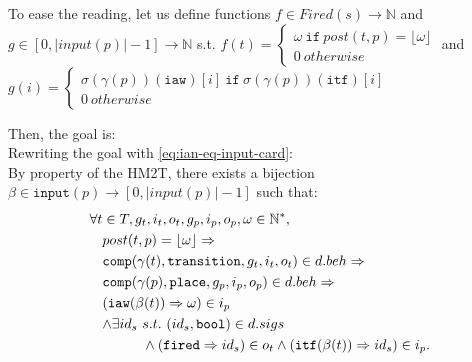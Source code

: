 \begin{itemize}
  To ease the reading, let us define functions
  $f\in{}Fired(s)\rightarrow\mathbb{N}$ and
  $g\in[0,\vert{}input(p)\vert-1]\rightarrow\mathbb{N}$ s.t. $f(t)=
  \begin{cases}
    \omega~\mathtt{if}~post(t,p)=\lfloor\omega\rfloor \\
    0~otherwise
  \end{cases}$
  and $g(i)=
  \begin{cases}
    \sigma(\gamma(p))(\texttt{iaw})[i]~\mathtt{if}~\sigma(\gamma(p))(\texttt{itf})[i]\\
    0~otherwise 
  \end{cases}$

  \noindent{}Then, the goal is: \\
                               
  \noindent{}Rewriting the goal with \eqref{eq:ian-eq-input-card}:
  \\

  By property of the HM2T, there exists a bijection
  $\beta\in\mathtt{input}(p)\rightarrow{}[0,\vert{}input(p)\vert-1]$
  such that:
  \begin{equation}
    \label{eq:bij-input}
    \begin{aligned}[t]
      \forall{}t&\in{}T,g_t,i_t,o_t,g_p,i_p,o_p,\omega\in\mathbb{N}^{*}, \\
                & post(t,p)=\lfloor\omega\rfloor\Rightarrow \\
                & \mathtt{comp}(\gamma(t),\mathtt{transition},g_t,i_t,o_t)\in{}d.beh\Rightarrow \\
                & \mathtt{comp}(\gamma(p),\mathtt{place},g_p,i_p,o_p)\in{}d.beh\Rightarrow\\
                &
                  \begin{aligned}[t]
                    & (\mathtt{iaw}(\beta(t))\Rightarrow\omega)\in{}i_p \\
                    & \begin{aligned}[t]
                        \land\exists{}id_s~&s.t.~(id_s,\mathtt{bool})\in{}d.sigs \\
                                           & \land(\mathtt{fired}\Rightarrow{}id_s)\in{}o_t\land(\mathtt{itf}(\beta(t))\Rightarrow{}id_s)\in{}i_p.\\
                      \end{aligned} \\
                  \end{aligned}
      \\
    \end{aligned}
  \end{equation}


\end{itemize}
